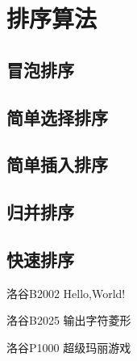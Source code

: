 \chapter{排序算法}
\section{冒泡排序}
\section{简单选择排序}
\section{简单插入排序}

\section{归并排序}

\section{快速排序}

\begin{problemset}
\item 洛谷B2002 Hello,World!
\item 洛谷B2025 输出字符菱形
\item 洛谷P1000 超级玛丽游戏
\end{problemset}


